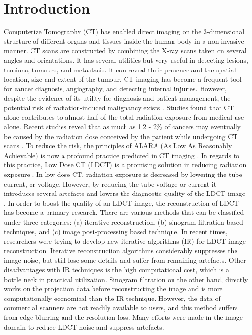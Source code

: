 \documentclass[journal]{IEEEtran}
\begin{document}
\section{Introduction}
\label{Introduction}
Computerize Tomography (CT) has enabled direct imaging on the 3-dimensional structure of different organs and tissues inside the human body in a non-invasive manner. CT scans are constructed by combining the X-ray scans taken on several angles and orientations.  It has several utilities but very useful in detecting lesions, tensions, tumours, and metastasis.  It can reveal their presence and the spatial location, size and extent of the tumour.  CT imaging has become a frequent tool for cancer diagnosis, angiography, and detecting internal injuries.  However, despite the evidence of its utility for diagnosis and patient management, the potential risk of radiation-induced malignancy exists \cite{brenner2007computed}.  Studies found that CT alone contributes to almost half of the total radiation exposure from medical use alone.  Recent studies reveal that as much as 1.2 - 2\% of cancers may eventually be caused by the radiation dose conceived by the patient while undergoing CT scans \cite{schauer2009national}.  To reduce the risk, the principles of ALARA (As Low As Reasonably Achievable) is now a profound practice predicted in CT imaging \cite{protection2007icrp}.  In regards to this practice, Low Dose CT (LDCT) is a promising solution in reducing radiation exposure \cite{trattner2014standardization}.  In low dose CT, radiation exposure is decreased by lowering the tube current, or voltage.  However, by reducing the tube voltage or current it introduces several artefacts and lowers the diagnostic quality of the LDCT image \cite{boas2012ct}.  In order to boost the quality of an LDCT image, the reconstruction of LDCT has become a primary research.  There are various methods that can be classified under three categories: (a) iterative reconstruction, (b) sinogram filtration based techniques, and (c) image post-processing based technique.  In recent times, researchers were trying to develop new iterative algorithms (IR) for LDCT image reconstruction.  Iterative reconstruction algorithms considerably suppresses the image noise, but still lose some details and suffer from remaining artefacts.  Other disadvantages with IR techniques is the high computational cost, which is a bottle neck in practical utilization.  Sinogram filtration on the other hand, directly works on the projection data before reconstructing the image and is more computationally economical than the IR technique.  However, the data of commercial scanners are not readily available to users, and this method suffers from edge blurring and the resolution loss.  Many efforts were made in the image domain to reduce LDCT noise and suppress artefacts.\\
\end{document}
